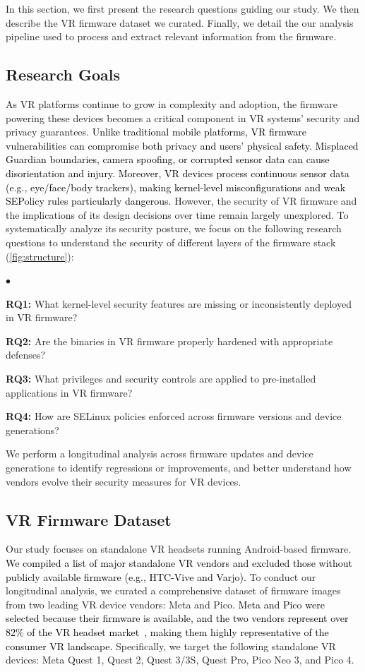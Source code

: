 \documentclass[sigconf]{acmart}
\newcommand{\rev}[1]{\textcolor{black}{#1}}
\newenvironment{packeditemize}{
\begin{list}{$\bullet$}{
\setlength{\labelwidth}{6pt}
\setlength{\itemsep}{2pt}
\setlength{\leftmargin}{\labelwidth}
\addtolength{\leftmargin}{\labelsep}
\setlength{\parindent}{1pt}
\setlength{\listparindent}{\parindent}
\setlength{\parsep}{1pt}
\setlength{\topsep}{1pt}}}{\end{list}}
\begin{document}
In this section, we first present the research questions guiding our study. We then describe the VR firmware dataset we curated. Finally, we detail the our analysis pipeline used to process and extract relevant information from the firmware. 

\subsection{Research Goals}

As VR platforms continue to grow in complexity and adoption, the firmware powering these devices becomes a critical component in VR systems' security and privacy guarantees.
\rev{Unlike traditional mobile platforms, VR firmware vulnerabilities can compromise both privacy and users’ physical safety. Misplaced Guardian boundaries, camera spoofing, or corrupted sensor data can cause disorientation and injury. Moreover, VR devices process continuous sensor data (e.g., eye/face/body trackers), making kernel-level misconfigurations and weak SEPolicy rules particularly dangerous.}
However, the security of VR firmware and the implications of its design decisions over time remain largely unexplored.
To systematically analyze its security posture, we focus on the following research questions to understand the security of different layers of the firmware stack (\autoref{fig:structure}):

\begin{packeditemize}
    \item \textbf{RQ1:} What kernel-level security features are missing or inconsistently deployed in VR firmware?
    \item \textbf{RQ2:} Are the binaries in VR firmware properly hardened with appropriate defenses?
    \item \textbf{RQ3:} What privileges and security controls are applied to pre-installed applications in VR firmware?
    \item \textbf{RQ4:} How are SELinux policies enforced across firmware versions and device generations?
\end{packeditemize}

We perform a longitudinal analysis across firmware updates and device generations to identify regressions or improvements, and better understand how vendors evolve their security measures for VR devices.

\subsection{VR Firmware Dataset}
Our study focuses on standalone VR headsets running Android-based firmware.
\rev{We compiled a list of major standalone VR vendors and excluded those without publicly available firmware (e.g., HTC-Vive and Varjo).}
To conduct our longitudinal analysis, we curated a comprehensive dataset of firmware images from two leading VR device vendors: Meta and Pico.
\rev{Meta and Pico were selected because their firmware is available, and the two vendors represent over 82\% of the VR headset market~\cite{market-share},
making them highly representative of the consumer VR landscape.}
Specifically, we target the following standalone VR devices: Meta Quest 1, Quest 2, Quest 3/3S, Quest Pro, Pico Neo 3, and Pico 4.
\end{document}

